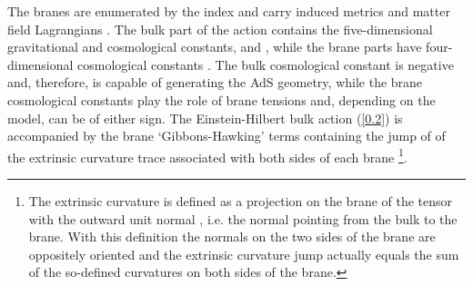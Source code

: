 \documentclass[a4paper,preprint,nofootinbib,
                 showpacs,preprintnumbers,amsmath,amssymb]{revtex4}
\begin{document}
The branes are enumerated by the index \coordHE{} and carry induced metrics 
\coordHE{} and matter field Lagrangians 
\coordHE{}. The bulk part of the action contains 
the five-dimensional gravitational and cosmological constants, \coordHE{} and 
\coordHE{}, while the brane parts have four-dimensional cosmological 
constants \coordHE{}. The bulk cosmological constant \coordHE{} is negative 
and, therefore, is capable of generating the AdS geometry, while 
the brane cosmological constants play the role of brane tensions 
\coordHE{} and, depending on the model, can be of either sign. The 
Einstein-Hilbert bulk action (\ref{0.2}) is accompanied by the 
brane `Gibbons-Hawking' terms containing the jump of of the 
extrinsic curvature trace \myHighlight{$[K]$}\coordHE{} associated with both sides of each brane 
\cite{ReallGH}\footnote{The extrinsic curvature \coordHE{} is 
defined as a projection on the brane of the tensor \coordHE{} 
with the outward unit normal \coordHE{}, i.e. the normal pointing from 
the bulk to the brane. With this definition the normals on the two 
sides of the brane are oppositely oriented and the extrinsic 
curvature jump \myHighlight{$[K_{\mu\nu}]$}\coordHE{} actually equals the sum of the 
so-defined curvatures on both sides of the brane.}. 
 
\end{document}
